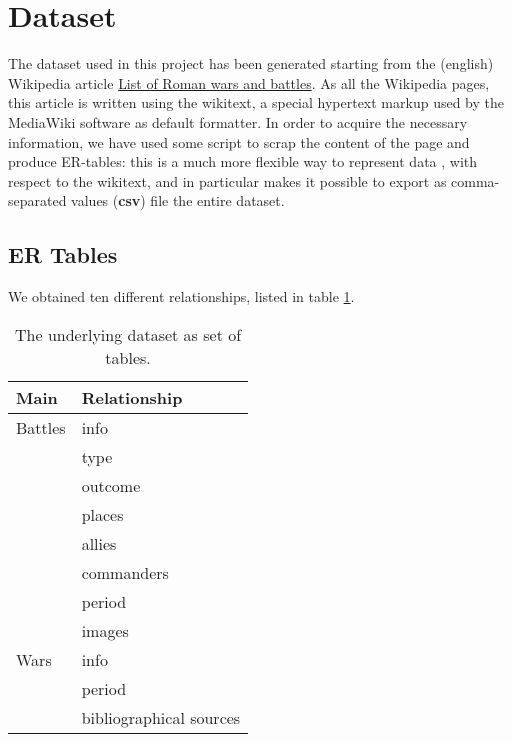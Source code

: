 \section{Dataset}\label{sec:dataset}

The dataset used in this project has been generated starting from the (english) Wikipedia article \href{https://en.wikipedia.org/w/index.php?title=List_of_Roman_wars_and_battles}{List of Roman wars and battles}. As all the Wikipedia pages, this article is written using the wikitext, a special hypertext markup used by the MediaWiki software as default formatter. In order to acquire the necessary information, we have used some script to scrap the content of the page and produce ER-tables: this is a much more flexible way to represent data \cite{Chen76}, with respect to the wikitext, and in particular makes it possible to export as comma-separated values (\textbf{csv}) file the entire dataset.

\subsection{ER Tables}
We obtained ten different relationships, listed in table \ref{table:dataset}.
\begin{table}[h]
    \centering
    \begin{tabular}{ll}
        \toprule
        Main    & Relationship            \\
        \midrule
        Battles & info                    \\
                & type                    \\
                & outcome                 \\
                & places                  \\
                & allies                  \\
                & commanders              \\
                & period                  \\
                & images                  \\
        Wars    & info                    \\
                & period                  \\
                & bibliographical sources \\
        \bottomrule
    \end{tabular}
    \caption{The underlying dataset as set of tables.}
    \label{table:dataset}
\end{table}

